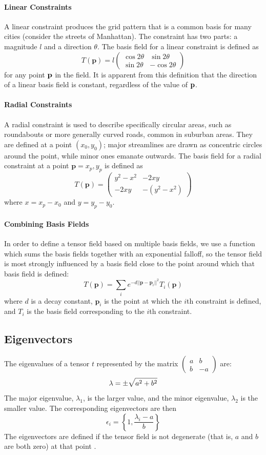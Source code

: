 \documentclass[twocolumn]{article}
\newcommand{\sqmat}[4]{\ensuremath{
    \left(\begin{array}{cc}
        #1 & #2 \\
        #3 & #4
    \end{array}\right)}}
\newcommand{\pt}{\textbf{p}}
\begin{document}
\paragraph{Linear Constraints}
A linear constraint produces the grid pattern that is a common basis for many
cities (consider the streets of Manhattan). The constraint has two parts: a
magnitude $l$ and a direction $\theta$. The basis field for a linear constraint
is defined as
\[
    T(\pt) =
        l\sqmat{\cos{2\theta}}{\sin{2\theta}}{\sin{2\theta}}{-\cos{2\theta}}
\]
for any point $\bf p$ in the field. It is apparent from this definition that
the direction of a linear basis field is constant, regardless of the value of
$\bf p$.

\paragraph{Radial Constraints}
A radial constraint is used to describe specifically circular areas, such as
roundabouts or more generally curved roads, common in suburban areas. They are
defined at a point $(x_0,y_0)$; major streamlines are drawn as concentric
circles
around the point, while minor ones emanate outwards. The basis field for a
radial constraint at a point $\pt=x_p,y_p$ is defined as
\[
    T(\pt) = \sqmat{y^2-x^2}{-2xy}{-2xy}{-(y^2-x^2)}
\]
where $x=x_p-x_0$ and $y=y_p-y_0$.

\paragraph{Combining Basis Fields}
In order to define a tensor field based on multiple basis fields, we use a
function which sums the basis fields together with an exponential falloff,
so the tensor field is most strongly influenced by a basis field close to
the point around which that basis field is defined:
\[
    T(\pt) = \sum_i e^{-d||\pt-\pt_i||^2}T_i(\pt)
\]
where $d$ is a decay constant, $\pt_i$ is the point at which the $i$th
constraint is defined, and $T_i$ is the basis field corresponding to the $i$th
constraint.

\subsection{Eigenvectors}
The eigenvalues of a tensor $t$ represented by the matrix $\sqmat{a}{b}{b}{-a}$
are:
\[
    \lambda = \pm\sqrt{a^2+b^2} \\
\]
The major eigenvalue, $\lambda_1$, is the larger value, and the minor
eigenvalue, $\lambda_2$ is the smaller value. The corresponding eigenvectors
are then
\[
    \epsilon_i = \left\{1,\frac{\lambda_i-a}{b}\right\}
\]
The eigenvectors are defined if the tensor field is not degenerate (that is,
$a$ and $b$ are both zero) at that point \cite{find-evs}.
\end{document}
